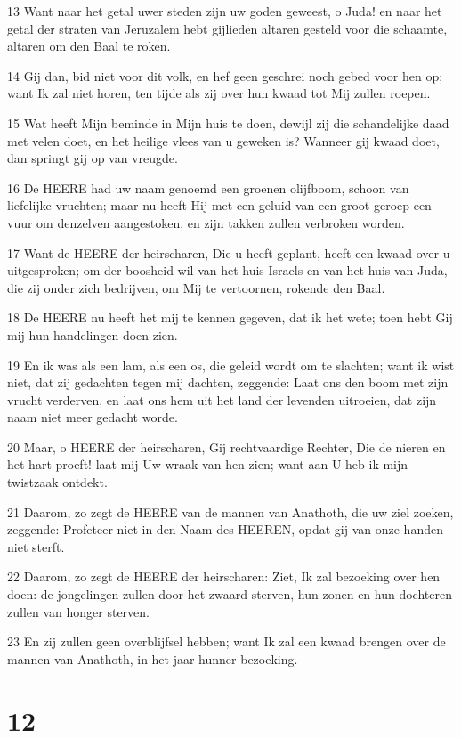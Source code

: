 \par 13 Want naar het getal uwer steden zijn uw goden geweest, o Juda! en naar het getal der straten van Jeruzalem hebt gijlieden altaren gesteld voor die schaamte, altaren om den Baal te roken.
\par 14 Gij dan, bid niet voor dit volk, en hef geen geschrei noch gebed voor hen op; want Ik zal niet horen, ten tijde als zij over hun kwaad tot Mij zullen roepen.
\par 15 Wat heeft Mijn beminde in Mijn huis te doen, dewijl zij die schandelijke daad met velen doet, en het heilige vlees van u geweken is? Wanneer gij kwaad doet, dan springt gij op van vreugde.
\par 16 De HEERE had uw naam genoemd een groenen olijfboom, schoon van liefelijke vruchten; maar nu heeft Hij met een geluid van een groot geroep een vuur om denzelven aangestoken, en zijn takken zullen verbroken worden.
\par 17 Want de HEERE der heirscharen, Die u heeft geplant, heeft een kwaad over u uitgesproken; om der boosheid wil van het huis Israels en van het huis van Juda, die zij onder zich bedrijven, om Mij te vertoornen, rokende den Baal.
\par 18 De HEERE nu heeft het mij te kennen gegeven, dat ik het wete; toen hebt Gij mij hun handelingen doen zien.
\par 19 En ik was als een lam, als een os, die geleid wordt om te slachten; want ik wist niet, dat zij gedachten tegen mij dachten, zeggende: Laat ons den boom met zijn vrucht verderven, en laat ons hem uit het land der levenden uitroeien, dat zijn naam niet meer gedacht worde.
\par 20 Maar, o HEERE der heirscharen, Gij rechtvaardige Rechter, Die de nieren en het hart proeft! laat mij Uw wraak van hen zien; want aan U heb ik mijn twistzaak ontdekt.
\par 21 Daarom, zo zegt de HEERE van de mannen van Anathoth, die uw ziel zoeken, zeggende: Profeteer niet in den Naam des HEEREN, opdat gij van onze handen niet sterft.
\par 22 Daarom, zo zegt de HEERE der heirscharen: Ziet, Ik zal bezoeking over hen doen: de jongelingen zullen door het zwaard sterven, hun zonen en hun dochteren zullen van honger sterven.
\par 23 En zij zullen geen overblijfsel hebben; want Ik zal een kwaad brengen over de mannen van Anathoth, in het jaar hunner bezoeking.

\chapter{12}

